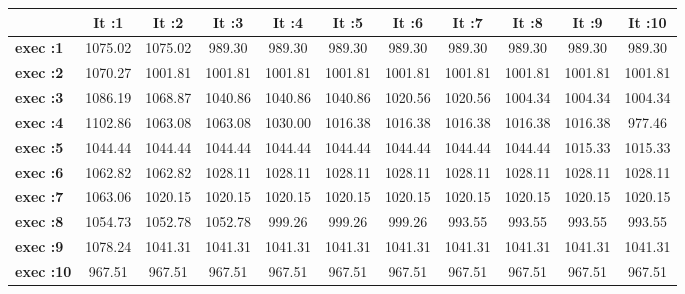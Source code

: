 \begin{tiny}\begin{tabular}{|l|c|c|c|c|c|c|c|c|c|c|}
\hline
&\textbf{It :1}&\textbf{It :2}&\textbf{It :3}&\textbf{It :4}&\textbf{It :5}&\textbf{It :6}&\textbf{It :7}&\textbf{It :8}&\textbf{It :9}&\textbf{It :10}\\\hline
\textbf{exec :1}&1075.02&1075.02&989.30&989.30&989.30&989.30&989.30&989.30&989.30&989.30\\\hline
\textbf{exec :2}&1070.27&1001.81&1001.81&1001.81&1001.81&1001.81&1001.81&1001.81&1001.81&1001.81\\\hline
\textbf{exec :3}&1086.19&1068.87&1040.86&1040.86&1040.86&1020.56&1020.56&1004.34&1004.34&1004.34\\\hline
\textbf{exec :4}&1102.86&1063.08&1063.08&1030.00&1016.38&1016.38&1016.38&1016.38&1016.38&977.46\\\hline
\textbf{exec :5}&1044.44&1044.44&1044.44&1044.44&1044.44&1044.44&1044.44&1044.44&1015.33&1015.33\\\hline
\textbf{exec :6}&1062.82&1062.82&1028.11&1028.11&1028.11&1028.11&1028.11&1028.11&1028.11&1028.11\\\hline
\textbf{exec :7}&1063.06&1020.15&1020.15&1020.15&1020.15&1020.15&1020.15&1020.15&1020.15&1020.15\\\hline
\textbf{exec :8}&1054.73&1052.78&1052.78&999.26&999.26&999.26&993.55&993.55&993.55&993.55\\\hline
\textbf{exec :9}&1078.24&1041.31&1041.31&1041.31&1041.31&1041.31&1041.31&1041.31&1041.31&1041.31\\\hline
\textbf{exec :10}&967.51&967.51&967.51&967.51&967.51&967.51&967.51&967.51&967.51&967.51\\\hline
\end{tabular}
\end{tiny}